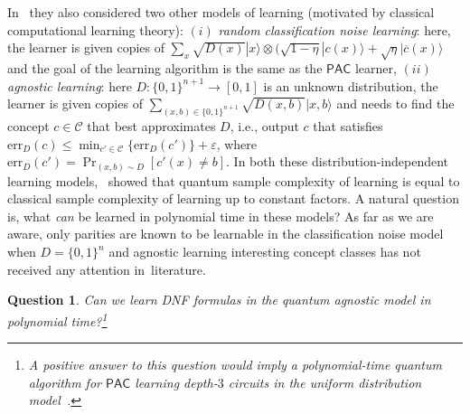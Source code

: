 \documentclass[11pt]{article}
\newcommand{\Cc}{\ensuremath{\mathcal{C}}}
\def\01{\{0,1\}}
\newcommand{\PAC}{\ensuremath{\mathsf{PAC}}}
\def\01{\{0,1\}}
\newcommand{\ket}[1]{|#1\rangle}
\newcommand{\err}{\mathrm{err}}
\newtheorem{question}{Question}
\begin{document}
%

In~\cite{DBLP:journals/jmlr/ArunachalamW18} they also considered two other models of learning (motivated by classical computational learning theory): $(i)$ \emph{random classification noise learning}: here, the learner is given copies of $\sum_x \sqrt{D(x)} \ket{x} \otimes (\sqrt{1-\eta}\ket{c(x)}+\sqrt{\eta}\ket{\overline{ c}(x)}$ and the goal of the learning algorithm is the same as the $\PAC$ learner, $(ii)$ \emph{agnostic learning}: here $D:\01^{n+1}\rightarrow [0,1]$ is an unknown distribution,  the learner  is given copies of $\sum_{(x,b)\in \01^{n+1}} \sqrt{D(x,b)} \ket{x,b}$ and needs to find the concept $c\in \Cc$ that best approximates $D$, i.e., output $c$ that satisfies $\err_D(c)\leq \min_{c'\in \Cc} \{\err_D(c')\}+\varepsilon$, where $\err_D(c')=\Pr_{(x,b)\sim D}[c'(x)\neq b]$. In both these distribution-independent learning models,~\cite{DBLP:journals/jmlr/ArunachalamW18} showed that quantum sample complexity of learning is equal to classical sample complexity of learning up to  constant factors. A natural question is, what \emph{can} be learned in polynomial time in these models? As far as we are aware, only parities are known to be learnable in the classification noise model~\cite{Grilo2019learning,caro2020quantum} when $D=\01^n$ and agnostic learning interesting concept classes has not received any attention in~literature.
\begin{question}
      Can we learn DNF formulas in the quantum agnostic model in  polynomial time?\footnote{A positive answer to this question would imply a polynomial-time quantum algorithm  for $\PAC$ learning depth-$3$ circuits in the uniform distribution model~\cite{feldman2009distribution}.} 
\end{question}
\end{document}
